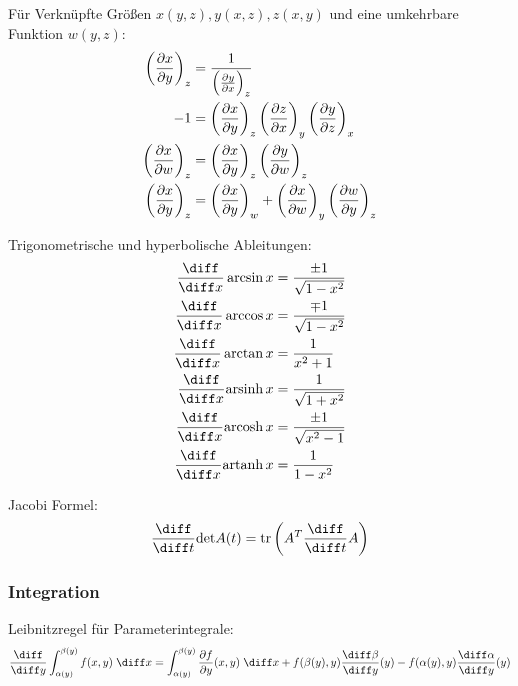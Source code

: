 \documentclass[11pt]{article}
\numberwithin{equation}{section}
\begin{document}
				\noindent
				Für Verknüpfte Größen $x(y,z), y(x,z), z(x,y)$ und eine umkehrbare Funktion $w(y,z)$:
				\begin{equation}
					\begin{aligned}
						\left( \frac{\partial x}{\partial y} \right)_z &= \frac{1}{\left( \frac{\partial y}{\partial x} \right)_z} \\
						-1 &= \left( \frac{\partial x}{\partial y} \right)_z \left( \frac{\partial z}{\partial x} \right)_y \left( \frac{\partial y}{\partial z} \right)_x \\
						\left( \frac{\partial x}{\partial w} \right)_z &= \left( \frac{\partial x}{\partial y} \right)_z \left( \frac{\partial y}{\partial w} \right)_z \\
						\left( \frac{\partial x}{\partial y} \right)_z &= \left( \frac{\partial x}{\partial y} \right)_w + \left( \frac{\partial x}{\partial w} \right)_y \left( \frac{\partial w}{\partial y} \right)_z \\
					\end{aligned}
				\end{equation}

				\noindent
				Trigonometrische und hyperbolische Ableitungen:
				\begin{equation}
					\begin{split}
						\frac{\diff}{\diff x}\arcsin x &= \frac{\pm 1}{\sqrt{1-x^2}} \\
						\frac{\diff}{\diff x}\arccos x &= \frac{\mp 1}{\sqrt{1-x^2}} \\
						\frac{\diff}{\diff x}\arctan x &= \frac{1}{x^2+1} \\
						\frac{\diff}{\diff x}\mathrm{arsinh}\,x &= \frac{1}{\sqrt{1+x^2}} \\
						\frac{\diff}{\diff x}\mathrm{arcosh}\,x &= \frac{\pm 1}{\sqrt{x^2-1}} \\
						\frac{\diff}{\diff x}\mathrm{artanh}\,x &= \frac{1}{1-x^2} \\
					\end{split}
				\end{equation}

				\noindent
				Jacobi Formel:
				\begin{equation}
					\tder{}{t}\mathrm{det} A(t) = \mathrm{tr}\left(A^T \tder{}{t} A\right)
				\end{equation}

			\subsubsection{Integration}
				\noindent
				Leibnitzregel für Parameterintegrale:
				\begin{equation}
					\tder{}{y} \int_{\alpha(y)}^{\beta(y)}f(x,y)\;\diff x = \int_{\alpha(y)}^{\beta(y)} \pder{f}{y}(x,y)\;\diff x + f(\beta(y),y)\tder{\beta}{y}(y)-f(\alpha(y),y)\tder{\alpha}{y}(y)
				\end{equation}
\end{document}
